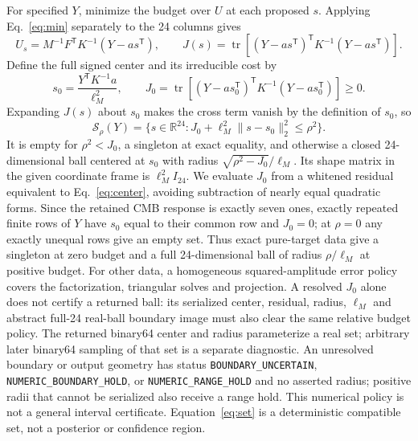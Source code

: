 \documentclass[aps,prd,onecolumn,11pt,nofootinbib,notitlepage]{revtex4-2}
\begin{document}
For specified $Y$, minimize the budget over $U$ at each proposed $s$. Applying Eq.~\eqref{eq:min} separately to the 24 columns gives
\begin{equation}
 U_s=M^{-1}F^{\mathsf T}K^{-1}(Y-a s^{\mathsf T}),\qquad
 J(s)=\operatorname{tr}\left[(Y-a s^{\mathsf T})^{\mathsf T}K^{-1}(Y-a s^{\mathsf T})\right].
 \label{eq:conditional}
\end{equation}
Define the full signed center and its irreducible cost by
\begin{equation}
 s_0=\frac{Y^{\mathsf T}K^{-1}a}{\ell_M^2},\qquad
 J_0=\operatorname{tr}\left[(Y-a s_0^{\mathsf T})^{\mathsf T}K^{-1}(Y-a s_0^{\mathsf T})\right]\ge0.
 \label{eq:center}
\end{equation}
Expanding $J(s)$ about $s_0$ makes the cross term vanish by the definition of $s_0$, so
\begin{equation}
 \boxed{\mathcal S_\rho(Y)=\{s\in\mathbb R^{24}:J_0+\ell_M^2\|s-s_0\|_2^2\le\rho^2\}.}
 \label{eq:set}
\end{equation}
It is empty for $\rho^2<J_0$, a singleton at exact equality, and otherwise a closed 24-dimensional ball centered at $s_0$ with radius $\sqrt{\rho^2-J_0}/\ell_M$. Its shape matrix in the given coordinate frame is $\ell_M^2 I_{24}$. We evaluate $J_0$ from a whitened residual equivalent to Eq.~\eqref{eq:center}, avoiding subtraction of nearly equal quadratic forms. Since the retained CMB response is exactly seven ones, exactly repeated finite rows of $Y$ have $s_0$ equal to their common row and $J_0=0$; at $\rho=0$ any exactly unequal rows give an empty set. Thus exact pure-target data give a singleton at zero budget and a full 24-dimensional ball of radius $\rho/\ell_M$ at positive budget. For other data, a homogeneous squared-amplitude error policy covers the factorization, triangular solves and projection. A resolved $J_0$ alone does not certify a returned ball: its serialized center, residual, radius, $\ell_M$ and abstract full-24 real-ball boundary image must also clear the same relative budget policy. The returned binary64 center and radius parameterize a real set; arbitrary later binary64 sampling of that set is a separate diagnostic. An unresolved boundary or output geometry has status \texttt{BOUNDARY\_UNCERTAIN}, \texttt{NUMERIC\_BOUNDARY\_HOLD}, or \texttt{NUMERIC\_RANGE\_HOLD} and no asserted radius; positive radii that cannot be serialized also receive a range hold. This numerical policy is not a general interval certificate. Equation~\eqref{eq:set} is a deterministic compatible set, not a posterior or confidence region.
\end{document}
